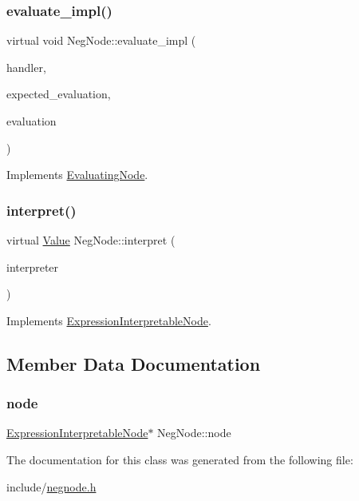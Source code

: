 \subsubsection{\texorpdfstring{evaluate\+\_\+impl()}{evaluate\_impl()}}
{\footnotesize\ttfamily virtual void Neg\+Node\+::evaluate\+\_\+impl (\begin{DoxyParamCaption}\item[{\hyperlink{classSystemHandler}{System\+Handler} $\ast$}]{handler,  }\item[{\hyperlink{statics_8h_a6664c451ca7787483a7981cc1de68dbb}{E\+V\+A\+L\+U\+A\+T\+I\+O\+N\+\_\+\+T\+Y\+PE}}]{expected\+\_\+evaluation,  }\item[{struct \hyperlink{structEvaluation}{Evaluation} $\ast$}]{evaluation }\end{DoxyParamCaption})\hspace{0.3cm}{\ttfamily [virtual]}}



Implements \hyperlink{classEvaluatingNode_a085fa06e0b46a93c814dc55cda0c1b26}{Evaluating\+Node}.

\mbox{\label{classNegNode_a35ff48d55ab355e27f33dcc21483e4c7}} 
\subsubsection{\texorpdfstring{interpret()}{interpret()}}
{\footnotesize\ttfamily virtual \hyperlink{classValue}{Value} Neg\+Node\+::interpret (\begin{DoxyParamCaption}\item[{\hyperlink{classInterpreter}{Interpreter} $\ast$}]{interpreter }\end{DoxyParamCaption})\hspace{0.3cm}{\ttfamily [virtual]}}



Implements \hyperlink{classExpressionInterpretableNode_a43650f046c48fc539f77a207e3c9181e}{Expression\+Interpretable\+Node}.



\subsection{Member Data Documentation}
\mbox{\label{classNegNode_ac1c92a11fc98afbb953cd391d84074c2}} 
\subsubsection{\texorpdfstring{node}{node}}
{\footnotesize\ttfamily \hyperlink{classExpressionInterpretableNode}{Expression\+Interpretable\+Node}$\ast$ Neg\+Node\+::node}



The documentation for this class was generated from the following file\+:\begin{DoxyCompactItemize}
\item 
include/\hyperlink{negnode_8h}{negnode.\+h}\end{DoxyCompactItemize}
